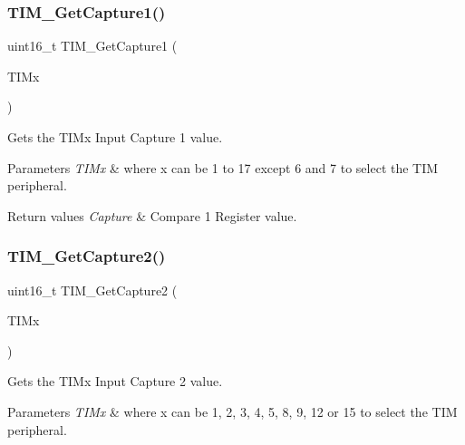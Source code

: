 \subsubsection{\texorpdfstring{TIM\_GetCapture1()}{TIM\_GetCapture1()}}
{\footnotesize\ttfamily uint16\+\_\+t T\+I\+M\+\_\+\+Get\+Capture1 (\begin{DoxyParamCaption}\item[{\mbox{\hyperlink{struct_t_i_m___type_def}{T\+I\+M\+\_\+\+Type\+Def}} $\ast$}]{T\+I\+Mx }\end{DoxyParamCaption})}



Gets the T\+I\+Mx Input Capture 1 value. 


\begin{DoxyParams}{Parameters}
{\em T\+I\+Mx} & where x can be 1 to 17 except 6 and 7 to select the T\+IM peripheral. \\
\hline
\end{DoxyParams}

\begin{DoxyRetVals}{Return values}
{\em Capture} & Compare 1 Register value. \\
\hline
\end{DoxyRetVals}
\mbox{\label{group___t_i_m___exported___functions_ga437fcf00ee9d0a9df9150cc120efc5ad}} 
\subsubsection{\texorpdfstring{TIM\_GetCapture2()}{TIM\_GetCapture2()}}
{\footnotesize\ttfamily uint16\+\_\+t T\+I\+M\+\_\+\+Get\+Capture2 (\begin{DoxyParamCaption}\item[{\mbox{\hyperlink{struct_t_i_m___type_def}{T\+I\+M\+\_\+\+Type\+Def}} $\ast$}]{T\+I\+Mx }\end{DoxyParamCaption})}



Gets the T\+I\+Mx Input Capture 2 value. 


\begin{DoxyParams}{Parameters}
{\em T\+I\+Mx} & where x can be 1, 2, 3, 4, 5, 8, 9, 12 or 15 to select the T\+IM peripheral. \\
\hline
\end{DoxyParams}

